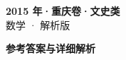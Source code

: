 \documentclass[zihao=-4, a4paper]{ctexart}
\begin{document}
\begin{center}
  {\Large\bfseries 2015 年·重庆卷·文史类}\\[4pt]
  {\large 数学 · 解析版}
\end{center}
\medskip
{}

\clearpage
{}
\begin{center}{\Large\bfseries 参考答案与详细解析}\end{center}
\medskip

\end{document}
